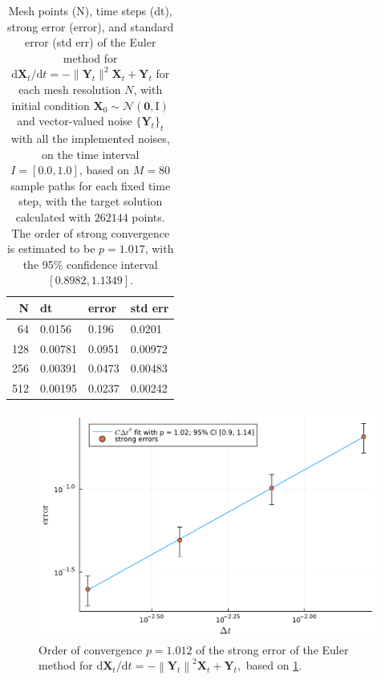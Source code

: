 \documentclass[reqno,12pt]{amsart}
\theoremstyle{plain} %
\theoremstyle{definition} %
\begin{document}
\begin{table}
    \begin{tabular}[htb]{|r|l|l|l|}
        \hline N & dt & error & std err \\
        \hline \hline
        64 & 0.0156 & 0.196 & 0.0201 \\
        128 & 0.00781 & 0.0951 & 0.00972 \\
        256 & 0.00391 & 0.0473 & 0.00483 \\
        512 & 0.00195 & 0.0237 & 0.00242 \\
        \hline
    \end{tabular}
    \bigskip

    \caption{Mesh points (N), time steps (dt), strong error (error), and standard error (std err) of the Euler method for $\mathrm{d}\mathbf{X}_t/\mathrm{d}t = - \| \mathbf{Y}_t\|^2 \mathbf{X}_t + \mathbf{Y}_t$ for each mesh resolution $N$, with initial condition $\mathbf{X}_0 \sim \mathcal{N}(\mathbf{0}, \mathrm{I})$ and vector-valued noise $\{\mathbf{Y}_t\}_t$ with all the implemented noises, on the time interval $I = [0.0, 1.0]$, based on $M = 80$ sample paths for each fixed time step, with the target solution calculated with $262144$ points. The order of strong convergence is estimated to be $p = 1.017$, with the 95\% confidence interval $[0.8982, 1.1349]$.}
    \label{taballnoises}
\end{table}

\begin{figure}[htb]
    \includegraphics[scale=0.6]{img/order_allnoises.pdf}
    \caption{Order of convergence $p = 1.012$ of the strong error of the Euler method for $\mathrm{d}\mathbf{X}_t/\mathrm{d}t = - \left\|\mathbf{Y}_t\right\|^2 \mathbf{X}_t + \mathbf{Y}_t,$ based on \cref{taballnoises}.}
    \label{figallnoises}
\end{figure}
\end{document}
